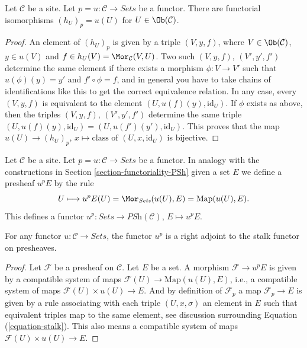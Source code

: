 \begin{lemma}
\label{lemma-points-recover}
Let $\mathcal{C}$ be a site.
Let $p = u : \mathcal{C} \to \textit{Sets}$ be a functor.
There are functorial isomorphisms
$(h_U)_p = u(U)$ for $U \in \Ob(\mathcal{C})$.
\end{lemma}

\begin{proof}
An element of $(h_U)_p$ is given by a triple $(V, y, f)$,
where $V \in \Ob(\mathcal{C})$, $y\in u(V)$ and
$f \in h_U(V) = \Mor_\mathcal{C}(V, U)$.
Two such $(V, y, f)$, $(V', y', f')$ determine the same element if
there exists a morphism $\phi : V \to V'$ such that
$u(\phi)(y) = y'$ and $f' \circ \phi = f$, and in general you have
to take chains of identifications like this to get the correct equivalence
relation. In any case, every $(V, y, f)$ is equivalent to
the element $(U, u(f)(y), \text{id}_U)$. If $\phi$ exists as above,
then the triples $(V, y, f)$, $(V', y', f')$ determine the same triple
$(U, u(f)(y), \text{id}_U) = (U, u(f')(y'), \text{id}_U)$.
This proves that the map
$u(U) \to (h_U)_p$, $x \mapsto \text{class of }(U, x, \text{id}_U)$
is bijective.
\end{proof}

\noindent
Let $\mathcal{C}$ be a site. Let $p = u : \mathcal{C} \to \textit{Sets}$
be a functor. In analogy with the constructions in
Section \ref{section-functoriality-PSh}
given a set $E$ we define a presheaf $u^pE$ by the rule
\begin{equation}
\label{equation-skyscraper}
U
\longmapsto
u^pE(U) = \Mor_{\textit{Sets}}(u(U), E) = \text{Map}(u(U), E).
\end{equation}
This defines a functor
$u^p : \textit{Sets} \to \textit{PSh}(\mathcal{C})$, $E \mapsto u^pE$.

\begin{lemma}
\label{lemma-adjoint-point-push-stalk}
For any functor $u : \mathcal{C} \to \textit{Sets}$, the functor $u^p$ is a right adjoint to the stalk functor
on presheaves.
\end{lemma}

\begin{proof}
Let $\mathcal{F}$ be a presheaf on $\mathcal{C}$.
Let $E$ be a set. A morphism $\mathcal{F} \to u^pE$
is given by a compatible system of maps
$\mathcal{F}(U) \to \text{Map}(u(U), E)$, i.e.,
a compatible system of maps $\mathcal{F}(U) \times u(U) \to E$.
And by definition of $\mathcal{F}_p$ a map $\mathcal{F}_p \to E$
is given by a rule associating with each triple $(U, x, \sigma)$
an element in $E$ such that equivalent triples map to the same element, see
discussion surrounding
Equation (\ref{equation-stalk}).
This also means a compatible system of maps $\mathcal{F}(U) \times u(U) \to E$.
\end{proof}

